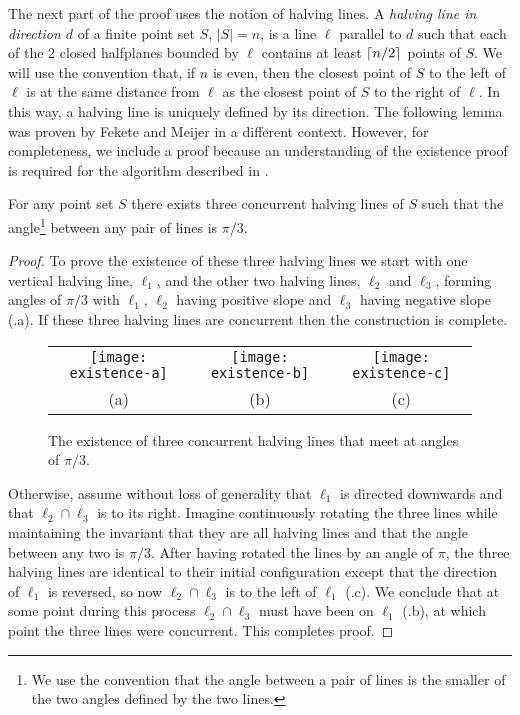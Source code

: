\documentclass{dmtcs}
\begin{document}
The next part of the proof uses the notion of halving lines.  A
\emph{halving line in direction $d$} of a finite point set $S$,
$|S|=n$, is a line $\ell$ parallel to $d$ such that each of the 2
closed halfplanes bounded by $\ell$ contains at least
$\left\lceil n/2 \right\rceil$ points of $S$.  We will use the convention that, if $n$ is even,
then the closest point of $S$ to the left of $\ell$ is at the same
distance from $\ell$ as the closest point of $S$ to the right of
$\ell$.  In this way, a halving line is uniquely defined by its
direction.  The following lemma was proven by Fekete and Meijer
\cite[Lemma~2]{fm00} in a different context.  However, for
completeness, we include a proof because an understanding of the
existence proof is required for the algorithm described in
.

\begin{lem}
For any point set $S$ there exists three concurrent halving lines 
of $S$ such that the angle\footnote{We use the convention that
the angle between a pair of lines is the smaller of the two angles
defined by the two lines.} between any pair of lines is $\pi/3$.
\end{lem}

\begin{proof}
To prove the existence of these three halving lines we start with one
vertical halving line, $\ell_1$, and the other two halving lines,
$\ell_2$ and $\ell_3$, forming angles of $\pi/3$ with $\ell_1$,
$\ell_2$ having positive slope and $\ell_3$ having negative slope
(.a).  If these three halving lines are concurrent
then the construction is complete. 

\begin{figure}
\begin{center}\begin{tabular}{ccc}
\texttt{[image: existence-a]} &
\texttt{[image: existence-b]} &
\texttt{[image: existence-c]} \\
(a) & (b) & (c)
\end{tabular}\end{center}
\caption{The existence of three concurrent halving lines that meet at angles of
$\pi/3$.}
\end{figure}
Otherwise, assume without loss of generality that $\ell_1$ is directed downwards and that
$\ell_2\cap \ell_3$ is to its right.  Imagine continuously rotating
the three lines while maintaining the invariant that they are all
halving lines and that the angle between any two is $\pi/3$.  After
having rotated the lines by an angle of $\pi$, the three halving lines
are identical to their initial configuration except that the direction
of $\ell_1$ is reversed, so now $\ell_2\cap\ell_3$ is to the left of
$\ell_1$ (.c).  We conclude that at some point
during this process $\ell_2\cap\ell_3$ must have been on $\ell_1$
(.b), at which point the three lines were
concurrent.  This completes proof.  
\end{proof}
\end{document}
